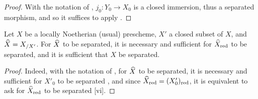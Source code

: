 \begin{proof}
\label{proof-1.10.15.6}
With the notation of , $j_0:Y_0\to X_0$ is a closed immersion, thus a separated morphism, and so it suffices to apply .
\end{proof}

\begin{prop}[10.15.7]
\label{1.10.15.7}
Let $X$ be a locally Noetherian (usual) prescheme, $X'$ a closed subset of $X$, and $\widehat{X}=X_{/X'}$.
For $\widehat{X}$ to be separated, it is necessary and sufficient for $\widehat{X}_{\mathrm{red}}$ to be separated, and it is sufficient that $X$ be separated.
\end{prop}

\begin{proof}
\label{proof-1.10.15.7}
Indeed, with the notation of , for $\widehat{X}$ to be separated, it is necessary and sufficient for $X'_0$ to be separated , and since $\widehat{X}_{\mathrm{red}}=(X'_0)_{\mathrm{red}}$, it is equivalent to ask for $\widehat{X}_{\mathrm{red}}$ to be separated [vi].
\end{proof}

